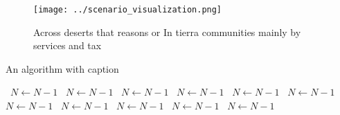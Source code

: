 \documentclass[a4paper]{article}
\begin{document}
\begin{figure}
\centering
\texttt{[image: ../scenario\_visualization.png]}
\caption{Across deserts that reasons or In tierra communities mainly by services and tax
}
\end{figure}
 
\begin{algorithm}
\caption{An algorithm with caption}
\begin{algorithmic}
\    \State $N \gets N - 1$
\    \State $N \gets N - 1$
\    \State $N \gets N - 1$
\    \State $N \gets N - 1$
\    \State $N \gets N - 1$
\    \State $N \gets N - 1$
\    \State $N \gets N - 1$
\    \State $N \gets N - 1$
\    \State $N \gets N - 1$
\    \State $N \gets N - 1$
\    \State $N \gets N - 1$
\EndWhile
\end{algorithmic}
\end{algorithm}
\end{document}
